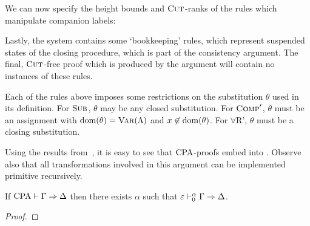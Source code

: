 We can now specify the height bounds and $\RCut$-ranks of the rules which manipulate
companion labels:
\begin{mathpar}



\end{mathpar}

Lastly, the system contains some `bookkeeping' rules, which represent suspended
states of the closing procedure, which is part of the consistency argument. The
final, $\RCut$-free proof which is produced by the argument will contain no
instances of these rules.
\begin{mathpar}


\end{mathpar}
Each of the rules above imposes some restrictions on the substitution $\theta$
used in its definition. For $\RSub$, $\theta$ may be any closed substitution.
For $\RComp'$, $\theta$ must be an assignment with $\dom(\theta) =
\var(\Lambda)$ and $x \not\in \dom(\theta)$. For $\forall$R',
$\theta$ must be a closing substitution.

Using the results from~\needcite{}, it is easy to see that $\CPA$-proofs embed
into . Observe also that all transformations involved in this
argument can be implemented primitive recursively.
\begin{proposition}\label{lem:cons-embed-cpa}
  If $\CPA \vdash \Gamma \sdash \Delta$ then there exists $\alpha$ such that
  $\varepsilon \vdash^\alpha_0 \Gamma \sdash \Delta$.
\end{proposition}
\begin{proof}
\end{proof}


